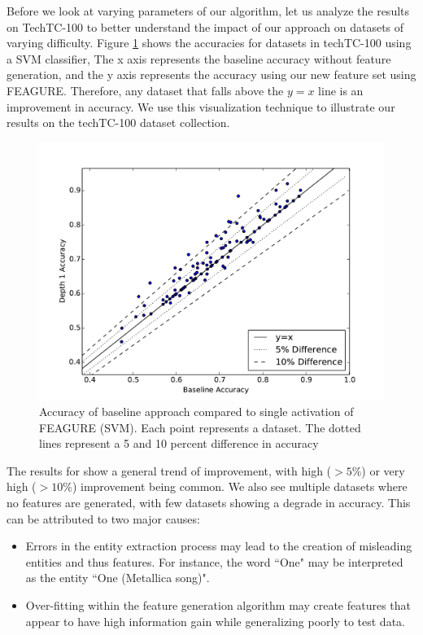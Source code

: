 \documentclass[twoside,11pt]{article}
\theoremstyle{definition}
\begin{document}
Before we look at varying parameters of our algorithm, let us analyze the results on TechTC-100 to better understand the impact of our approach on datasets of varying difficulty. Figure \ref{fig:svm_base_lvl1} shows the accuracies for datasets in techTC-100 using a SVM classifier, The x axis represents the baseline accuracy without feature generation, and the y axis represents the accuracy using our new feature set using FEAGURE. Therefore, any dataset that falls above the $y=x$ line is an improvement in accuracy. We use this visualization technique to illustrate our results on the techTC-100 dataset collection.

\begin{figure}
	\centering
	\includegraphics[width=0.8\linewidth]{svm_08_base_vs_lvl1}
	\caption{Accuracy of
		baseline approach compared to single activation of FEAGURE (SVM). Each point represents a dataset. The dotted lines represent a 5 and 10 percent difference in accuracy}
	\label{fig:svm_base_lvl1}
\end{figure}

The results for show a general trend of improvement, with high ($> 5\%$) or very high ($>10\%$) improvement being common. We also see multiple datasets where no features are generated, with few datasets showing a degrade in accuracy.
This can be attributed to two major causes:
\begin{itemize}
	\item Errors in the entity extraction process may lead to the creation of misleading entities and thus features. For instance, the word ``One" may be interpreted as the entity ``One (Metallica song)". 
	\item Over-fitting within the feature generation algorithm may create features that appear to have high information gain while generalizing poorly to test data.
\end{itemize}
\end{document}
